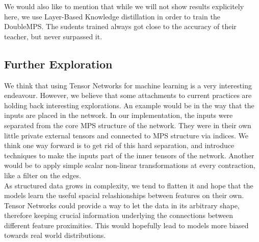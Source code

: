 \documentclass{article}
\theoremstyle{definition}
\theoremstyle{definition}
\begin{document}
We would also like to mention that while we will not show results explicitely here, we use Layer-Based Knowledge distillation in order to train the DoubleMPS. The sudents trained always got close to the accuracy of their teacher, but never surpassed it.


\subsection{Further Exploration}
We think that using Tensor Networks for machine learning is a very interesting endeavour. However, we believe that some attachments to current practices are holding back interesting explorations. An example would be in the way that the inputs are placed in the network. In our implementation, the inputs were separated from the core MPS structure of the network. They were in their own little private external tensors and connected to MPS structure via indices. We think one way forward is to get rid of this hard separation, and introduce techniques to make the inputs part of the inner tensors of the network. Another would be to apply simple scalar non-linear transformations at every contraction, like a filter on the edges. \\


As structured data grows in complexity, we tend to flatten it and hope that the models learn the useful spacial relashionships between features on their own. Tensor Networks could provide a way to let the data in its arbitrary shape, therefore keeping crucial information underlying the connections between different feature proximities. This would hopefully lead to models more biased towards real world distributions.



\printbibliography
\end{document}
